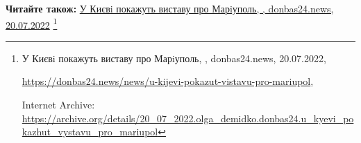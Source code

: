  
 
 
 
 

\def\pubIA{https://archive.org/details/20_07_2022.olga_demidko.donbas24.u_kyevi_pokazhut_vystavu_pro_mariupol}
\def\pubTitle{У Києвi покажуть виставу про Марiуполь}
\def\pubDate{20.07.2022}
\def\pubOrigin{https://donbas24.news/news/u-kijevi-pokazut-vistavu-pro-mariupol}
\def\pubAuthor{\pubAuthorDemidko}

\textbf{Читайте також:} \href{\pubIA}{%
\pubTitle, \pubAuthor, donbas24.news, \pubDate}%
\footnote{\pubTitle, \pubAuthor, donbas24.news, \pubDate, \par\url{\pubOrigin}, \par Internet Archive: \url{\pubIA}}
